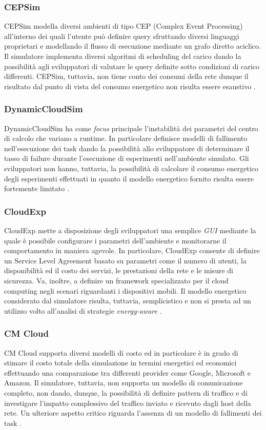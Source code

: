 {\subsubsection*{CEPSim}
CEPSim \cite{higashino2015cepsim} modella diversi ambienti di tipo CEP (Complex Event Processing) \cite{luckham1998complex} all'interno dei quali l'utente può definire query sfruttando diversi linguaggi proprietari e modellando il flusso di esecuzione mediante un grafo diretto aciclico. Il simulatore implementa diversi algoritmi di scheduling del carico dando la possibilità agli sviluppatori di valutare le query definite sotto condizioni di carico differenti. CEPSim, tuttavia, non tiene conto dei consumi della rete dunque il risultato dal punto di vista del consumo energetico non risulta essere esaustivo \cite{mansouri2020cloud}. 
\subsubsection*{DynamicCloudSim}
DynamicCloudSim \cite{bux2013dynamiccloudsim} ha come \emph{focus} principale l'instabilità dei parametri del centro di calcolo che variano a runtime. In particolare definisce modelli di fallimento nell'esecuzione dei task dando la possibilità allo sviluppatore di determinare il tasso di failure durante l'esecuzione di esperimenti nell'ambiente simulato. Gli sviluppatori non hanno, tuttavia, la possibilità di calcolare il consumo energetico degli esperimenti effettuati in quanto il modello energetico fornito risulta essere fortemente limitato \cite{mansouri2020cloud}.
\subsubsection*{CloudExp}
CloudExp \cite{jararweh2014cloudexp} mette a disposizione degli sviluppatori una semplice \emph{GUI} mediante la quale è possibile configurare i parametri dell'ambiente e monitorarne il comportamento in maniera agevole. In particolare, CloudExp consente di definire un Service Level Agreement basato su parametri come il numero di utenti, la disponibilità ed il costo dei servizi, le prestazioni della rete e le misure di sicurezza. Va, inoltre, a definire un framework specializzato per il cloud computing negli scenari riguardanti i dispositivi mobili. Il modello energetico considerato dal simulatore risulta, tuttavia, semplicistico e non si presta ad un utilizzo volto all'analisi di strategie \emph{energy-aware} \cite{mansouri2020cloud} \cite{khalil2017cloud}. 
\subsubsection*{CM Cloud}
CM Cloud \cite{alves2016cm} supporta diversi modelli di costo ed in particolare è in grado di stimare il costo totale della simulazione in termini energetici ed economici effettuando una comparazione tra differenti provider come Google, Microsoft e Amazon. Il simulatore, tuttavia, non supporta un modello di comunicazione completo, non dando, dunque, la possibilità di definire pattern di traffico e di investigare l'impatto complessivo del traffico inviato e ricevuto dagli host della rete. Un ulteriore aspetto critico riguarda l'assenza di un modello di fallimenti dei task \cite{mansouri2020cloud}.  
}
